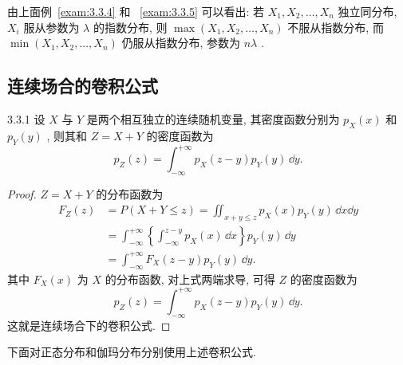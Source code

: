    由上面例~\ref{exam:3.3.4} 和 ~\ref{exam:3.3.5} 可以看出: 若 $X_1,X_2,\ldots,X_n$ 独立同分布, $X_i$ 服从参数为 $\lambda$ 的指数分布, 则 $\max(X_1,X_2,\ldots,X_n)$ 不服从指数分布, 而 $\min(X_1,X_2,\ldots,X_n)$ 仍服从指数分布, 参数为 $n\lambda$ .
   \subsection{连续场合的卷积公式}\label{ssec:3.3.3}
   \begin{theorem}{}{3.3.1}
   	设 $X$ 与 $Y$ 是两个相互独立的连续随机变量, 其密度函数分别为 $p_X(x)$ 和 $p_Y(y)$ , 则其和 $Z=X+Y$ 的密度函数为
   	\begin{equation}
   		p_Z(z)=\int_{-\infty}^{+\infty}p_X(z-y)p_Y(y)\,\dd y.\label{eq:3.3.13}
   	\end{equation}
   	\begin{proof}
   		$Z=X+Y$ 的分布函数为
   		\begin{align*}
   			F_Z(z)&=P(X+Y\leqslant z)=\iint_{x+y\leqslant z}p_X(x)p_Y(y)\,\dd x\dd y\\
   			&=\int_{-\infty}^{+\infty}\left\{\int_{-\infty}^{z-y}p_X(x)\,\dd x\right\}p_Y(y)\,\dd y\\
   			&=\int_{-\infty}^{+\infty}F_X(z-y)p_Y(y)\,\dd y.
   		\end{align*}
   		其中 $F_X(x)$ 为 $X$ 的分布函数, 对上式两端求导, 可得 $Z$ 的密度函数为
   		\begin{equation*}
   			p_Z(z)=\int_{-\infty}^{+\infty}p_X(z-y)p_Y(y)\,\dd y.
   		\end{equation*}
   		这就是连续场合下的卷积公式.
   	\end{proof}
   \end{theorem}
   下面对正态分布和伽玛分布分别使用上述卷积公式.

